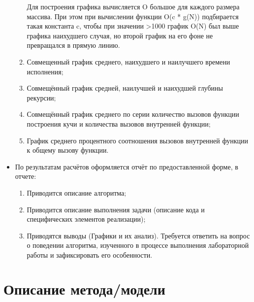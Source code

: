 \documentclass[12pt, a4paper]{report}
\begin{document}
\begin{itemize}
\begin{enumerate}
			Для построения графика вычисляется O большое для каждого размера массива. При этом при вычислении функции O(c * g(N)) подбирается такая константа c, чтобы при значении >1000 график O(N) был выше графика наихудшего случая, но второй график на его фоне не превращался в прямую линию.
			\item Совмещенный график среднего, наихудшего и наилучшего времени исполнения;
			\item Совмещённый график средней, наилучшей и наихудшей глубины рекурсии;
			\item Совмещённый график среднего по серии количество вызовов функции построения кучи и количества вызовов внутренней функции;
			\item График среднего процентного соотношения вызовов внутренней функции к общему вызову функции.
		\end{enumerate}
		\item По результатам расчётов оформляется отчёт по предоставленной форме, в отчете:
		\begin{enumerate}
			\item Приводится описание алгоритма;
			\item Приводится описание выполнения задачи (описание кода и специфических элементов реализации);
			\item Приводятся выводы (Графики и их анализ). Требуется ответить на вопрос о поведении алгоритма, изученного в процессе выполнения лабораторной работы и зафиксировать его особенности.
		\end{enumerate}
	\end{itemize}

	\section*{Описание метода/модели}
	\large
\end{document}
